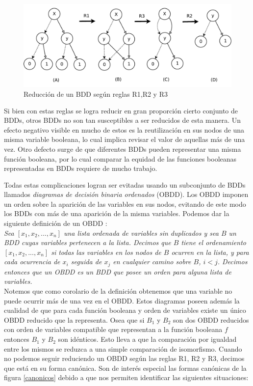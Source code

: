 \documentclass[titlepage, 12pt]{book}
\begin{document}
\begin{figure}[htp]
  \centering
    \includegraphics[scale=0.75]{Imagenes/reduccionBDD.pdf}
  \caption{Reducci\'on de un BDD seg\'un reglas R1,R2 y R3}
  \label{reduccionBDD}
\end{figure}


Si bien con estas reglas se logra reducir en gran proporci\'on cierto conjunto de BDDs, otros BDDs no son tan susceptibles a ser reducidos de esta manera. Un efecto negativo visible en mucho de estos es la reutilizaci\'on en sus nodos de una misma variable booleana, lo cual implica revisar el valor de aquellas m\'as de una vez. Otro defecto surge de que diferentes BDDs pueden representar una misma funci\'on booleana, por lo cual comparar la equidad de las funciones booleanas representadas en BDDs requiere de mucho trabajo.

Todas estas complicaciones logran ser evitadas usando un subconjunto de BDDs llamados \textit{diagramas de decisi\'on binaria ordenados} (OBDD). Los OBDD imponen un orden sobre la aparici\'on de las variables en sus nodos, evitando de este modo los BDDs con m\'as de una aparici\'on de la misma variables. Podemos dar la siguiente definici\'on de un OBDD \cite{Huth}:\\

\textit{Sea $[x_1,x_2,...,x_n]$ una lista ordenada de variables sin duplicados y sea $B$ un BDD cuyas variables pertenecen a la lista. Decimos que $B$ tiene el ordenamiento $[x_1,x_2,...,x_n]$ si todas las variables en los nodos de $B$ ocurren en la lista, y para cada ocurrencia de $x_i$ seguida de $x_j$ en cualquier camino sobre $B$, $i < j$. Decimos entonces que un OBDD es un BDD que posee un orden para alguna lista de variables.}\\

Notemos que como corolario de la definici\'on obtenemos que una variable no puede ocurrir m\'as de una vez en el OBDD. Estos diagramas poseen adem\'as la cualidad de que para cada funci\'on booleana y orden de variables existe un \'unico OBDD reducido que la representa. Osea que si $B_1$ y $B_2$ son dos OBDD reducidos con orden de variables compatible que representan a la funci\'on booleana $f$ entonces $B_1$ y $B_2$ son id\'enticos. Esto lleva a que la comparaci\'on por igualdad entre los mismos se reduzca a una simple comparaci\'on de isomorfismo. Cuando no podemos seguir reduciendo un OBDD seg\'un las reglas R1, R2 y R3, decimos que est\'a en su forma can\'onica. Son de inter\'es especial las formas can\'onicas de la figura \ref{canonicos} debido a que nos permiten identificar las siguientes situaciones:
\end{document}
